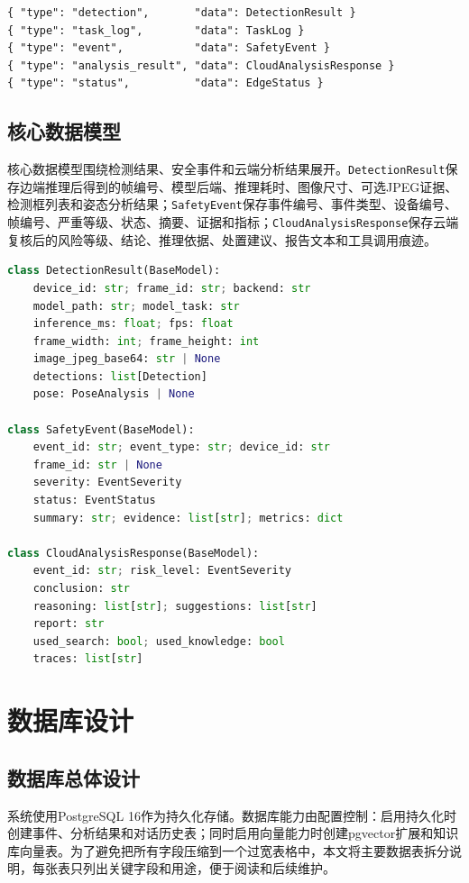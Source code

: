 \begin{lstlisting}[language={}]
{ "type": "detection",       "data": DetectionResult }
{ "type": "task_log",        "data": TaskLog }
{ "type": "event",           "data": SafetyEvent }
{ "type": "analysis_result", "data": CloudAnalysisResponse }
{ "type": "status",          "data": EdgeStatus }
\end{lstlisting}

\subsection{核心数据模型}

核心数据模型围绕检测结果、安全事件和云端分析结果展开。\verb|DetectionResult|保存边端推理后得到的帧编号、模型后端、推理耗时、图像尺寸、可选JPEG证据、检测框列表和姿态分析结果；\verb|SafetyEvent|保存事件编号、事件类型、设备编号、帧编号、严重等级、状态、摘要、证据和指标；\verb|CloudAnalysisResponse|保存云端复核后的风险等级、结论、推理依据、处置建议、报告文本和工具调用痕迹。

\begin{lstlisting}[language=Python]
class DetectionResult(BaseModel):
    device_id: str; frame_id: str; backend: str
    model_path: str; model_task: str
    inference_ms: float; fps: float
    frame_width: int; frame_height: int
    image_jpeg_base64: str | None
    detections: list[Detection]
    pose: PoseAnalysis | None

class SafetyEvent(BaseModel):
    event_id: str; event_type: str; device_id: str
    frame_id: str | None
    severity: EventSeverity
    status: EventStatus
    summary: str; evidence: list[str]; metrics: dict

class CloudAnalysisResponse(BaseModel):
    event_id: str; risk_level: EventSeverity
    conclusion: str
    reasoning: list[str]; suggestions: list[str]
    report: str
    used_search: bool; used_knowledge: bool
    traces: list[str]
\end{lstlisting}

\section{数据库设计}

\subsection{数据库总体设计}

系统使用PostgreSQL 16作为持久化存储。数据库能力由配置控制：启用持久化时创建事件、分析结果和对话历史表；同时启用向量能力时创建pgvector扩展和知识库向量表。为了避免把所有字段压缩到一个过宽表格中，本文将主要数据表拆分说明，每张表只列出关键字段和用途，便于阅读和后续维护。


